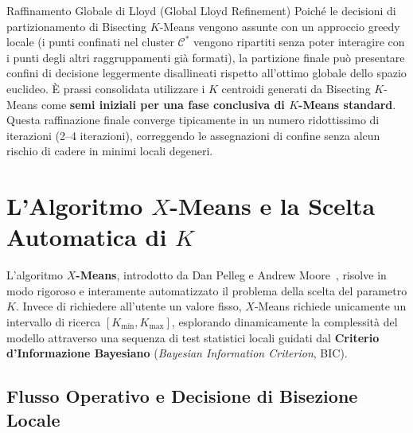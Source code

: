 \begin{noteblock}{Raffinamento Globale di Lloyd (Global Lloyd Refinement)}
Poiché le decisioni di partizionamento di Bisecting $K$-Means vengono assunte con un approccio greedy locale (i punti confinati nel cluster $\mathcal{C}^*$ vengono ripartiti senza poter interagire con i punti degli altri raggruppamenti già formati), la partizione finale può presentare confini di decisione leggermente disallineati rispetto all'ottimo globale dello spazio euclideo. È prassi consolidata utilizzare i $K$ centroidi generati da Bisecting $K$-Means come \textbf{semi iniziali per una fase conclusiva di $K$-Means standard}. Questa raffinazione finale converge tipicamente in un numero ridottissimo di iterazioni (2--4 iterazioni), correggendo le assegnazioni di confine senza alcun rischio di cadere in minimi locali degeneri.
\end{noteblock}

\section{L'Algoritmo \texorpdfstring{$X$}{X}-Means e la Scelta Automatica di \texorpdfstring{$K$}{K}}
\label{sec:dm-xmeans-algorithm}

L'algoritmo \textbf{$X$-Means}, introdotto da Dan Pelleg e Andrew Moore~\cite{pelleg2000}, risolve in modo rigoroso e interamente automatizzato il problema della scelta del parametro $K$. Invece di richiedere all'utente un valore fisso, $X$-Means richiede unicamente un intervallo di ricerca $[K_{\min}, K_{\max}]$, esplorando dinamicamente la complessità del modello attraverso una sequenza di test statistici locali guidati dal \textbf{Criterio d'Informazione Bayesiano} (\textit{Bayesian Information Criterion}, BIC).

\subsection{Flusso Operativo e Decisione di Bisezione Locale}

